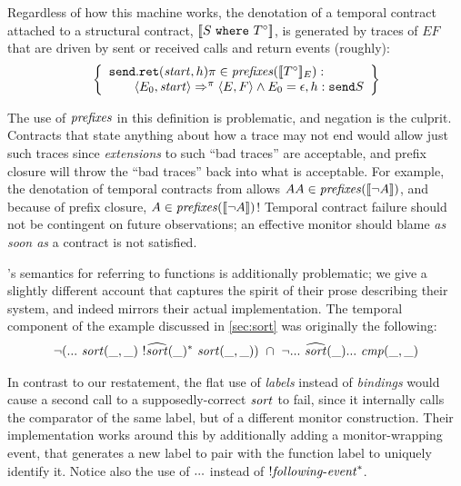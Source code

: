 %
Regardless of how this machine works, the denotation of a temporal contract attached to a structural contract, $[\![ S\ {\tt where}\ T^\circ ]\!]$, is generated by traces of $\mathit{EF}$ that are driven by sent or received calls and return events (roughly):
\begin{align*}
 \left\{
   \begin{array}{l}
    {\tt send.ret}(\mathit{start},h)\pi \in \mathit{prefixes}([\![ T^\circ ]\!]_{E}) :
 \\ \qquad\langle E_0, \mathit{start}\rangle \Rightarrow^\pi \langle E, F\rangle \wedge E_0 = \epsilon, h : {\tt send}S
\end{array}\right\}
\end{align*}

The use of $\mathit{prefixes}$ in this definition is problematic, and negation is the culprit.
%
Contracts that state anything about how a trace may not end would allow just such traces since \emph{extensions} to such ``bad traces'' are acceptable, and prefix closure will throw the ``bad traces'' back into what is acceptable.
%
%
For example, the denotation of temporal contracts from \dfm{} allows $AA \in \mathit{prefixes}([\![ \neg A ]\!])$, and because of prefix closure, $A \in \mathit{prefixes}([\![ \neg A ]\!])$!
%
Temporal contract failure should not be contingent on future observations; an effective monitor should blame \emph{as soon as} a contract is not satisfied.

\dfm's semantics for referring to functions is additionally problematic; we give a slightly different account that captures the spirit of their prose describing their system, and indeed mirrors their actual implementation.
%
The temporal component of the example discussed in \autoref{sec:sort} was originally the following:
\begin{align*}
 \neg ({\tt ...}~ \mathit{sort}(\_,\_)~ ! \widehat{\mathit{sort}}(\_)^*~ \mathit{sort}(\_,\_)) 
 \ \cap\  \neg {\tt ...}~ \widehat{\mathit{sort}}(\_) {\tt ...}~ \mathit{cmp}(\_,\_)
\end{align*}

In contrast to our restatement, the flat use of \emph{labels} instead of \emph{bindings} would cause a second call to a supposedly-correct $\mathit{sort}$ to fail, since it internally calls the comparator of the same label, but of a different monitor construction.
%
Their implementation works around this by additionally adding a monitor-wrapping event, that generates a new label to pair with the function label to uniquely identify it.
%
Notice also the use of ${\tt ...}$ instead of $! \mathit{following\text{-}event}^*$.

